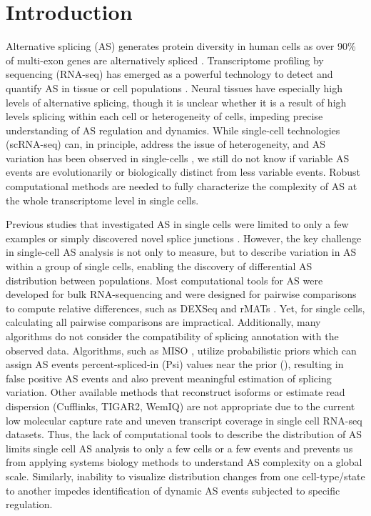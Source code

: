 \section{Introduction}
Alternative splicing (AS) generates protein diversity in human cells as over 90\% of multi-exon genes are alternatively spliced \cite{Wang2008-xh, Johnson:2003kh,Pan:2008jq,Takeda:2009gl}. Transcriptome profiling by sequencing (RNA-seq) has emerged as a powerful technology to detect and quantify AS in tissue or cell populations \cite{Merkin:2012hv,BarbosaMorais:2012crb,Wang2008-xh}. Neural tissues have especially high levels of alternative splicing, though it is unclear whether it is a result of high levels splicing within each cell or heterogeneity of cells, impeding precise understanding of AS regulation and dynamics. While single-cell technologies (scRNA-seq) can, in principle, address the issue of heterogeneity, and AS variation has been observed in single-cells \cite{Marinov2014-iw,Shalek2013-ez,Welch2016-it}, we still do not know if variable AS events are evolutionarily or biologically distinct from less variable events. Robust computational methods are needed to fully characterize the complexity of AS at the whole transcriptome level in single cells.

Previous studies that investigated AS in single cells were limited to only a few examples \cite{Shalek2013-ez,Waks2011-ye} or simply discovered novel splice junctions \cite{Marinov2014-iw}. However, the key challenge in single-cell AS analysis is not only to measure, but to describe variation in AS within a group of single cells, enabling the discovery of differential AS distribution between populations. Most computational tools for AS were developed for bulk RNA-sequencing and were designed for pairwise comparisons to compute relative differences, such as DEXSeq \cite{Anders2012-fq} and rMATs \cite{Shen2014-zq}. Yet, for single cells, calculating all pairwise comparisons are impractical. Additionally, many algorithms do not consider the compatibility of splicing annotation with the observed data. Algorithms, such as MISO \cite{Katz:2010iv}, utilize probabilistic priors which can assign AS events percent-spliced-in (Psi) values near the prior (), resulting in false positive AS events and also prevent meaningful estimation of splicing variation. Other available methods that reconstruct isoforms or estimate read dispersion (Cufflinks, TIGAR2, WemIQ) \cite{Nariai:2014hd,Trapnell201,Zhang:2015hx} are not appropriate due to the current low molecular capture rate and uneven transcript coverage in single cell RNA-seq datasets. Thus, the lack of computational tools to describe the distribution of AS limits single cell AS analysis to only a few cells or a few events and prevents us from applying systems biology methods to understand AS complexity on a global scale. Similarly, inability to visualize distribution changes from one cell-type/state to another impedes identification of dynamic AS events subjected to specific regulation.


